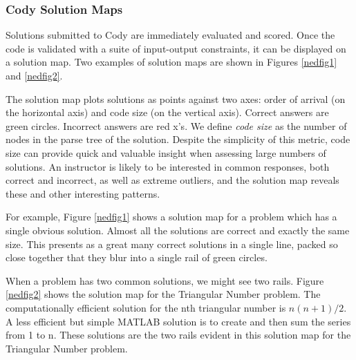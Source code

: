 \documentclass[12pt]{article}
\begin{document}
\subsubsection{Cody Solution Maps}
Solutions submitted to Cody are immediately evaluated and scored. Once the code is validated with a suite of input-output constraints, it can be displayed on a solution map. Two examples of solution maps are shown in Figures \ref{nedfig1} and \ref{nedfig2}. 
 
The solution map plots solutions as points against two axes: order of arrival (on the horizontal axis) and code size (on the vertical axis). Correct answers are green circles. Incorrect answers are red x's. We define \textit{code size} as the number of nodes in the parse tree of the solution. Despite the simplicity of this metric, code size can provide quick and valuable insight when assessing large numbers of solutions. An instructor is likely to be interested in common responses, both correct and incorrect, as well as extreme outliers, and the solution map reveals these and other interesting patterns.
 
For example, Figure \ref{nedfig1} shows a solution map for a problem which has a single obvious solution. Almost all the solutions are correct and exactly the same size. This presents as a great many correct solutions in a single line, packed so close together that they blur into a single rail of green circles.

When a problem has two common solutions, we might see two rails. Figure \ref{nedfig2} shows the solution map for the Triangular Number problem. The computationally efficient solution for the nth triangular number is $n(n+1)/2$. A less efficient but simple MATLAB solution is to create and then sum the series from 1 to n. These solutions are the two rails evident in this solution map for the Triangular Number problem.
\end{document}
